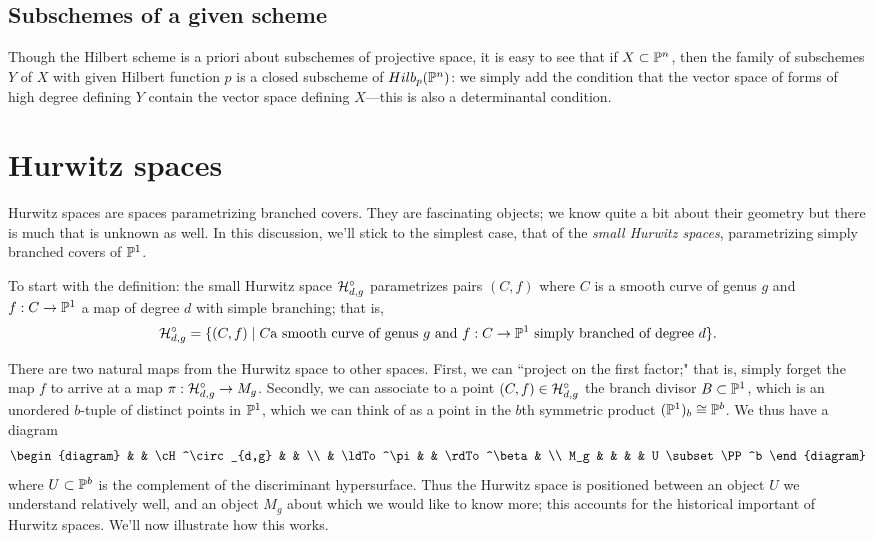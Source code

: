 \subsection{Subschemes of a given scheme}

Though the Hilbert scheme is a priori about subschemes of projective space, it is easy to see that if $X\subset {\mathbb P}^n$,
then the family of subschemes $Y$ of $X$ with given Hilbert function $p$ is a closed subscheme of $Hilb_p({\mathbb P}^n)$: we simply
add the condition that the vector space of forms of high degree defining $Y$  contain the vector space defining $X$---this is also a determinantal condition.

\section{Hurwitz spaces}\label{Hurwitz spaces}

Hurwitz spaces are spaces parametrizing branched covers. They are fascinating objects; we know quite a bit about their geometry but there is much that is unknown as well. In this discussion, we'll stick to the simplest case, that of the \emph{small Hurwitz spaces}, parametrizing simply branched covers of ${\mathbb P}^1$.

To start with the definition: the small Hurwitz space $\mathcal H^\circ_{d,g}$ parametrizes pairs $(C, f)$ where $C$ is a smooth curve of genus $g$ and $f : C \to {\mathbb P}^1$ a map of degree $d$ with simple branching; that is,
$$
\mathcal H^\circ_{d,g} = \{ (C, f) \mid C  \text{a smooth curve of genus $g$ and } f:C \to {\mathbb P}^1 \text{ simply branched of degree } d\}.
$$

There are two natural maps from the Hurwitz space to other spaces. First, we can ``project on the first factor;" that is, simply forget the map $f$ to arrive at a map $\pi : \mathcal H^\circ_{d,g} \to M_g$. Secondly, we can associate to a point $(C,f) \in \mathcal H^\circ_{d,g}$ the branch divisor $B \subset {\mathbb P}^1$, which is an unordered $b$-tuple of distinct points in ${\mathbb P}^1$, which we can think of as a point in the $b$th symmetric product $({\mathbb P}^1)_b  \cong {\mathbb P}^b$. We thus have a diagram
$$
\begin{diagram}
& & \cH^\circ_{d,g} & & \\
& \ldTo^\pi & & \rdTo^\beta & \\
M_g & & & & U \subset \PP^b
\end{diagram}
$$
where $U \subset {\mathbb P}^b$ is the complement of the discriminant hypersurface. Thus the Hurwitz space is positioned between an object $U$ we understand relatively well, and an object $M_g$ about which we would like to know more; this accounts for the historical important of Hurwitz spaces. We'll now illustrate how this works.

